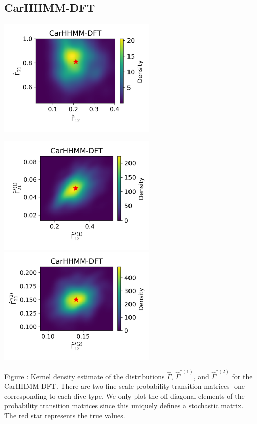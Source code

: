 \documentclass{article}
\begin{document}
        \subsection{CarHHMM-DFT}
        \begin{center}
        \includegraphics[width=3in]{../Plots/hhmm_FV_Gamma_density_-1.png}
        
        \includegraphics[width=3in]{../Plots/hhmm_FV_Gamma_density_0.png}
        \includegraphics[width=3in]{../Plots/hhmm_FV_Gamma_density_1.png}
        \end{center}
        
        \noindent Figure : Kernel density estimate of the distributions $\hat \Gamma$, $\hat \Gamma^{*(1)}$, and $\hat \Gamma^{*(2)}$ for the CarHHMM-DFT. There are two fine-scale probability transition matrices- one corresponding to each dive type. We only plot the off-diagonal elements of the probability transition matrices since this uniquely defines a stochastic matrix. The red star represents the true values.
        \addtocounter{fignum}{1}
        
\end{document}
